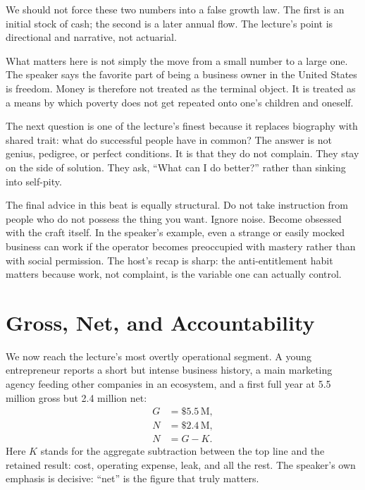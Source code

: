 \begin{remark}
We should not force these two numbers into a false growth law. The first is an initial stock of cash; the second is a later annual flow. The lecture's point is directional and narrative, not actuarial.
\end{remark}

What matters here is not simply the move from a small number to a large one. The speaker says the favorite part of being a business owner in the United States is freedom. Money is therefore not treated as the terminal object. It is treated as a means by which poverty does not get repeated onto one's children and oneself.

The next question is one of the lecture's finest because it replaces biography with shared trait: what do successful people have in common? The answer is not genius, pedigree, or perfect conditions. It is that they do not complain. They stay on the side of solution. They ask, ``What can I do better?'' rather than sinking into self-pity.

The final advice in this beat is equally structural. Do not take instruction from people who do not possess the thing you want. Ignore noise. Become obsessed with the craft itself. In the speaker's example, even a strange or easily mocked business can work if the operator becomes preoccupied with mastery rather than with social permission. The host's recap is sharp: the anti-entitlement habit matters because work, not complaint, is the variable one can actually control.

\section{Gross, Net, and Accountability}

We now reach the lecture's most overtly operational segment. A young entrepreneur reports a short but intense business history, a main marketing agency feeding other companies in an ecosystem, and a first full year at \text{\$}5.5 million gross but \text{\$}2.4 million net:
\begin{align}
G &= \text{\$}5.5\,\mathrm{M},\\
N &= \text{\$}2.4\,\mathrm{M},\\
N &= G - K.
\end{align}
Here \(K\) stands for the aggregate subtraction between the top line and the retained result: cost, operating expense, leak, and all the rest. The speaker's own emphasis is decisive: ``net'' is the figure that truly matters.


